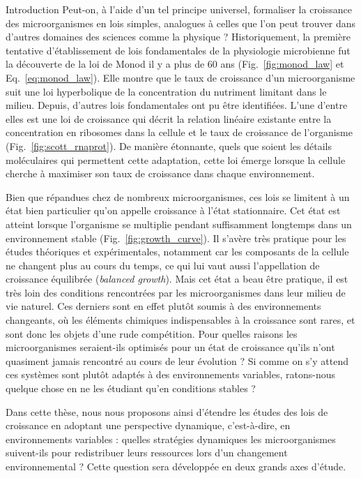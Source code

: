 \begin{chapter_summary}{Introduction}
Peut-on, à l'aide d'un tel principe universel, formaliser la croissance des microorganismes en lois simples, analogues à celles que l'on peut trouver dans d'autres domaines des sciences comme la physique ?
Historiquement, la première tentative d'établissement de lois fondamentales de la physiologie microbienne  fut la découverte de la loi de Monod il y a plus de 60 ans (Fig.~\ref{fig:monod_law} et Eq.~\ref{eq:monod_law}).
Elle montre que le taux de croissance d'un microorganisme suit une loi hyperbolique de la concentration du nutriment limitant dans le milieu.
Depuis, d'autres lois fondamentales ont pu être identifiées.
L'une d'entre elles est une loi de croissance qui décrit la relation linéaire existante entre la concentration en ribosomes dans la cellule et le taux de croissance de l'organisme (Fig.~\ref{fig:scott_rnaprot}).
De manière étonnante, quels que soient les détails moléculaires qui permettent cette adaptation, cette loi émerge lorsque la cellule cherche à maximiser son taux de croissance dans chaque environnement.

Bien que répandues chez de nombreux microorganismes, ces lois se limitent à un état bien particulier qu'on appelle croissance à l'état stationnaire.
Cet état est atteint lorsque l'organisme se multiplie pendant suffisamment longtemps dans un environnement stable (Fig.~\ref{fig:growth_curve}).
Il s'avère très pratique pour les études théoriques et expérimentales, notamment car les composants de la cellule ne changent plus au cours du temps, ce qui lui vaut aussi l'appellation de croissance équilibrée (\textit{balanced growth}).
Mais cet état a beau être pratique, il est très loin des conditions rencontrées par les microorganismes dans leur milieu de vie naturel.
Ces derniers sont en effet plutôt soumis à des environnements changeants, où les éléments chimiques indispensables à la croissance sont rares, et sont donc les objets d'une rude compétition.
Pour quelles raisons les microorganismes seraient-ils optimisés pour un état de croissance qu'ils n'ont quasiment jamais rencontré au cours de leur évolution ?
Si comme on s'y attend ces systèmes sont plutôt adaptés à des environnements variables, ratons-nous quelque chose en ne les étudiant qu'en conditions stables ?

Dans cette thèse, nous nous proposons ainsi d'étendre les études des lois de croissance en adoptant une perspective dynamique, c'est-à-dire, en environnements variables : quelles stratégies dynamiques les microorganismes suivent-ils pour redistribuer leurs ressources lors d'un changement environnemental ?
Cette question sera développée en deux grands axes d'étude.


\end{chapter_summary}
